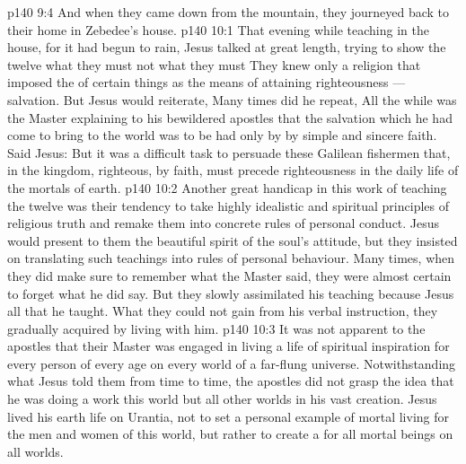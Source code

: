 \vs p140 9:4 \pc And when they came down from the mountain, they journeyed back to their home in Zebedee’s house.
\vs p140 10:1 That evening while teaching in the house, for it had begun to rain, Jesus talked at great length, trying to show the twelve what they must  not what they must  They knew only a religion that imposed the  of certain things as the means of attaining righteousness --- salvation. But Jesus would reiterate,  Many times did he repeat,  All the while was the Master explaining to his bewildered apostles that the salvation which he had come to bring to the world was to be had only by  by simple and sincere faith. Said Jesus:  But it was a difficult task to persuade these Galilean fishermen that, in the kingdom,  righteous, by faith, must precede  righteousness in the daily life of the mortals of earth.
\vs p140 10:2 \pc Another great handicap in this work of teaching the twelve was their tendency to take highly idealistic and spiritual principles of religious truth and remake them into concrete rules of personal conduct. Jesus would present to them the beautiful spirit of the soul’s attitude, but they insisted on translating such teachings into rules of personal behaviour. Many times, when they did make sure to remember what the Master said, they were almost certain to forget what he did  say. But they slowly assimilated his teaching because Jesus  all that he taught. What they could not gain from his verbal instruction, they gradually acquired by living with him.
\vs p140 10:3 It was not apparent to the apostles that their Master was engaged in living a life of spiritual inspiration for every person of every age on every world of a far\hyp{}flung universe. Notwithstanding what Jesus told them from time to time, the apostles did not grasp the idea that he was doing a work  this world but  all other worlds in his vast creation. Jesus lived his earth life on Urantia, not to set a personal example of mortal living for the men and women of this world, but rather to create a  for all mortal beings on all worlds.
